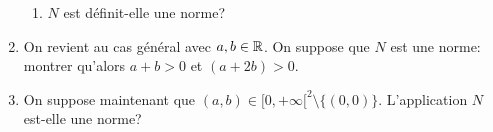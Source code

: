 \documentclass[a4paper]{tp_um}
\begin{document}
\begin{enumerate}
\begin{enumerate}


    \item $N$ est définit-elle une norme?

        
\end{enumerate}


\item On revient au cas général avec $a,b\in\mathbb{R}$. On suppose que $N$ est  une norme: montrer qu'alors $a+b > 0$ et $(a+2b) > 0$.





\item On suppose maintenant que $(a,b) \in [0,+\infty[^2 \setminus \{(0,0)\}.$
L'application $N$ est-elle une norme? 



\end{enumerate}
\end{document}
